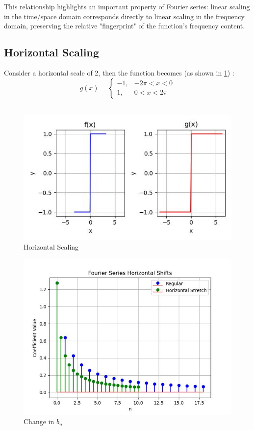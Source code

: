 \documentclass{article}
\begin{document}
This relationship highlights an important property of Fourier series: linear scaling in the time/space domain corresponds directly to linear scaling in the frequency domain, preserving the relative "fingerprint" of the function's frequency content.  

\subsection{Horizontal Scaling}
Consider a horizontal scale of 2, then the function becomes (as shown in \ref{fig5}) :
\begin{equation}
g(x) = 
\begin{cases} 
-1, & -2\pi < x < 0 \\
1, & 0 < x < 2\pi
\end{cases}
\end{equation}\\
\begin{figure}
    \centering
    \includegraphics[width=\textwidth]{horizontal_scaling.jpg}
    \caption{Horizontal Scaling}
    \label{fig5}
\end{figure}
\begin{figure}
    \centering
    \includegraphics[width=\textwidth]{horizontal_stem_stretch.jpg}
    \caption{Change in $b_n$}
    \label{figure 6}
\end{figure}
\end{document}
